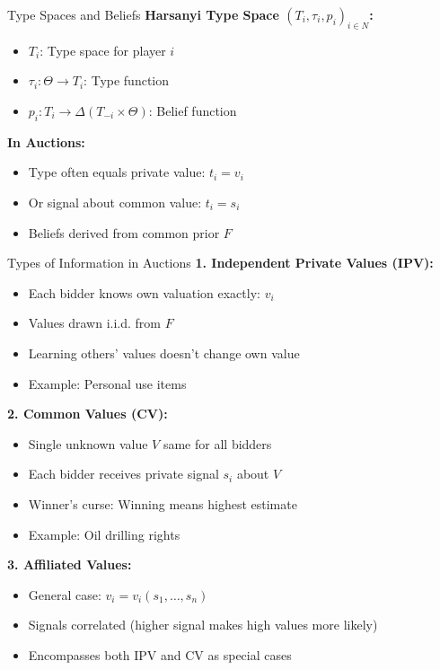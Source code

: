 \documentclass[xcolor={x11names}, aspectratio=169 ]{beamer}
\begin{document}
\begin{frame}{Type Spaces and Beliefs}
\textbf{Harsanyi Type Space $(T_i, \tau_i, p_i)_{i \in N}$:}
\begin{itemize}
  \item $T_i$: Type space for player $i$
  \item $\tau_i: \Theta \to T_i$: Type function
  \item $p_i: T_i \to \Delta(T_{-i} \times \Theta)$: Belief function
\end{itemize}

\textbf{In Auctions:}
\begin{itemize}
  \item Type often equals private value: $t_i = v_i$
  \item Or signal about common value: $t_i = s_i$
  \item Beliefs derived from common prior $F$
\end{itemize}
\end{frame}

\begin{frame}{Types of Information in Auctions}
\textbf{1. Independent Private Values (IPV):}
\begin{itemize}
  \item Each bidder knows own valuation exactly: $v_i$
  \item Values drawn i.i.d. from $F$
  \item Learning others' values doesn't change own value
  \item Example: Personal use items
\end{itemize}

\textbf{2. Common Values (CV):}
\begin{itemize}
  \item Single unknown value $V$ same for all bidders
  \item Each bidder receives private signal $s_i$ about $V$
  \item Winner's curse: Winning means highest estimate
  \item Example: Oil drilling rights
\end{itemize}

\textbf{3. Affiliated Values:}
\begin{itemize}
  \item General case: $v_i = v_i(s_1, \ldots, s_n)$
  \item Signals correlated (higher signal makes high values more likely)
  \item Encompasses both IPV and CV as special cases
\end{itemize}
\end{frame}
\end{document}
